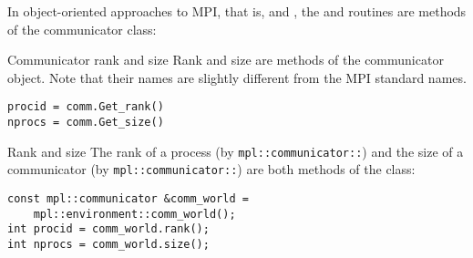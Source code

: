 In object-oriented approaches to MPI,
that is,  and ,
the  and 
routines are methods of the communicator class:

\begin{pythonnote}{Communicator rank and size}
  Rank and size are methods of the communicator object.
  Note that their names are slightly different from the MPI standard names.
\begin{lstlisting}
procid = comm.Get_rank()
nprocs = comm.Get_size()
\end{lstlisting}
\end{pythonnote}

\begin{mplnote}{Rank and size}
  The rank of a process (by \lstinline+mpl::communicator::+) and
  the size of a communicator (by \lstinline+mpl::communicator::+)
  are both methods of the  class:
\begin{lstlisting}
const mpl::communicator &comm_world =
    mpl::environment::comm_world();
int procid = comm_world.rank();
int nprocs = comm_world.size();
\end{lstlisting}
\end{mplnote}
